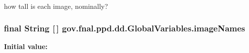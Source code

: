 how tall is each image, nominally? \hypertarget{classgov_1_1fnal_1_1ppd_1_1dd_1_1GlobalVariables_a356be5e37e706b201f6bc26130b73ce3}{
\subsubsection[{image\-Names}]{\setlength{\rightskip}{0pt plus 5cm}final String \mbox{[}$\,$\mbox{]} gov.\-fnal.\-ppd.\-dd.\-Global\-Variables.\-image\-Names\hspace{0.3cm}{\ttfamily [static]}}}\label{classgov_1_1fnal_1_1ppd_1_1dd_1_1GlobalVariables_a356be5e37e706b201f6bc26130b73ce3}
{\bfseries Initial value\-:}
